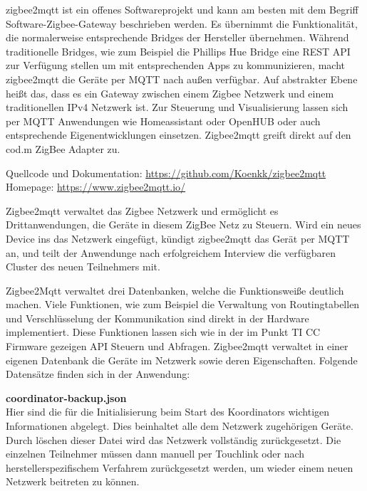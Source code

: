 zigbee2mqtt ist ein offenes Softwareprojekt und kann am besten mit dem Begriff \grqq Software-Zigbee-Gateway\grqq{} beschrieben werden. Es übernimmt die Funktionalität, die normalerweise entsprechende
Bridges der Hersteller übernehmen. Während traditionelle Bridges, wie zum Beispiel die Phillips Hue Bridge eine REST API zur Verfügung stellen um mit entsprechenden
Apps zu kommunizieren, macht zigbee2mqtt die Geräte per MQTT nach außen verfügbar. Auf abstrakter Ebene heißt das, dass es ein Gateway zwischen einem Zigbee Netzwerk und
einem traditionellen IPv4 Netzwerk ist. Zur Steuerung und Visualisierung lassen sich per MQTT Anwendungen wie \grqq Homeassistant\grqq{} oder \grqq OpenHUB\grqq{} oder auch entsprechende
Eigenentwicklungen einsetzen. Zigbee2mqtt greift direkt auf den cod.m ZigBee Adapter zu.

Quellcode und Dokumentation: \url{https://github.com/Koenkk/zigbee2mqtt} \\
Homepage: \url{https://www.zigbee2mqtt.io/}

Zigbee2mqtt verwaltet das Zigbee Netzwerk und ermöglicht es Drittanwendungen, die Geräte in diesem ZigBee Netz zu Steuern. Wird ein neues Device ins das Netzwerk eingefügt, 
kündigt zigbee2mqtt das Gerät per MQTT an, und teilt der Anwendunge nach erfolgreichem Interview die verfügbaren Cluster des neuen Teilnehmers mit.

Zigbee2Mqtt verwaltet drei Datenbanken, welche die Funktionsweiße deutlich machen. Viele Funktionen, wie zum Beispiel die Verwaltung von Routingtabellen und
Verschlüsselung der Kommunikation sind direkt in der Hardware implementiert. Diese Funktionen lassen sich wie in der im Punkt TI CC Firmware gezeigen API Steuern und Abfragen.
Zigbee2mqtt verwaltet in einer eigenen Datenbank die Geräte im Netzwerk sowie deren Eigenschaften.
Folgende Datensätze finden sich in der Anwendung:

\textbf{coordinator-backup.json}\\

Hier sind die für die Initialisierung beim Start des Koordinators wichtigen Informationen abgelegt. Dies beinhaltet alle dem Netzwerk zugehörigen Geräte.
Durch löschen dieser Datei wird das Netzwerk vollständig zurückgesetzt. Die einzelnen Teilnehmer müssen dann manuell per Touchlink oder nach herstellerspezifischem Verfahrem
zurückgesetzt werden, um wieder einem neuen Netzwerk beitreten zu können.


